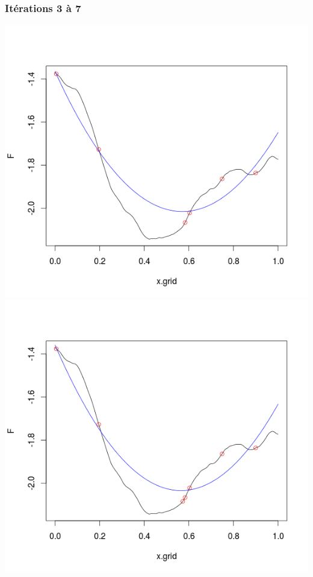 \documentclass{beamer}
\begin{document}
\begin{frame}
\frametitle{Itérations 3 à 7}
\includegraphics[trim = 10mm 20mm 10mm 10mm, clip, width=.3\paperwidth]{fig/prs3.png}
\includegraphics[trim = 10mm 20mm 10mm 10mm, clip, width=.3\paperwidth]{fig/prs4.png}

\end{frame}
\end{document}
